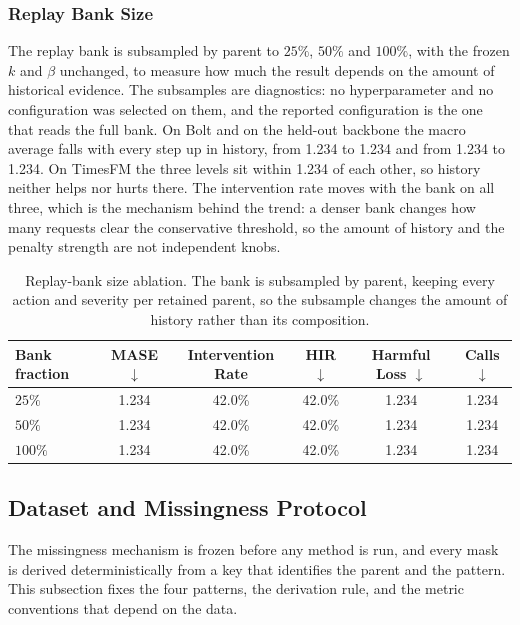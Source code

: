 \documentclass{article}
\begin{document}
\subsubsection{Replay Bank Size}
\label{app:replaysize}
The replay bank is subsampled by parent to $25\%$, $50\%$ and $100\%$, with the frozen $k$ and
$\beta$ unchanged, to measure how much the result depends on the amount of historical evidence.
The subsamples are diagnostics: no hyperparameter and no configuration was selected on them,
and the reported configuration is the one that reads the full bank. On Bolt and on the
held-out backbone the macro average falls with every step up in history, from 1.234
to 1.234 and from 1.234 to 1.234. On TimesFM the three levels
sit within 1.234 of each other, so history neither helps nor hurts there. The
intervention rate moves with the bank on all three, which is the mechanism behind the trend:
a denser bank changes how many requests clear the conservative threshold, so the amount of
history and the penalty strength are not independent knobs.

\begin{table}[h]
  \caption{Replay-bank size ablation. The bank is subsampled by parent, keeping
  every action and severity per retained parent, so the subsample changes the amount of
  history rather than its composition.}
  \label{tab:app-replaysize}
  \centering
  \small
  \setlength{\tabcolsep}{4pt}
  \begin{tabular}{lccccc}
    \toprule
    Bank fraction & MASE $\downarrow$ & Intervention Rate & HIR $\downarrow$ & Harmful Loss $\downarrow$ & Calls $\downarrow$ \\
    \midrule
    $25\%$  & 1.234  & 42.0\%  & 42.0\%  & 1.234  & 1.234 \\
    $50\%$  & 1.234  & 42.0\%  & 42.0\%  & 1.234  & 1.234 \\
    $100\%$ & 1.234 & 42.0\% & 42.0\% & 1.234 & 1.234 \\
    \bottomrule
  \end{tabular}
\end{table}

\subsection{Dataset and Missingness Protocol}
\label{app:data-protocol}
The missingness mechanism is frozen before any method is run, and every mask is derived
deterministically from a key that identifies the parent and the pattern. This subsection fixes
the four patterns, the derivation rule, and the metric conventions that depend on the data.
\end{document}
